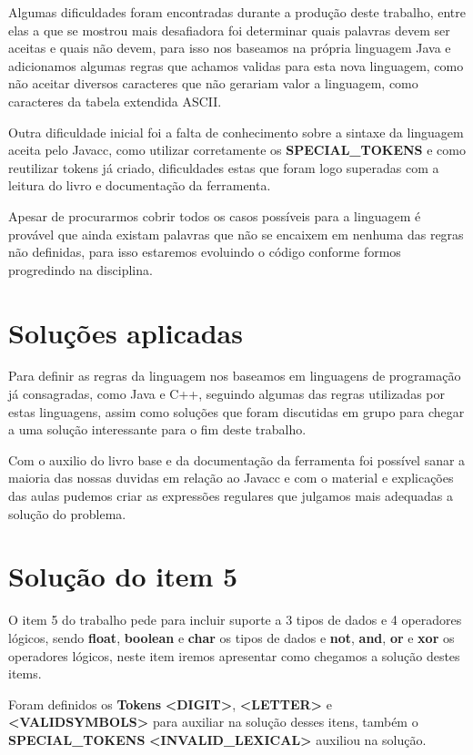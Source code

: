 \documentclass[
	article,			%
	11pt,				%
	oneside,			%
	a4paper,			%
	portuguese,			%
	brazil,				%
	sumario=tradicional
	]{abntex2}
\begin{document}
Algumas dificuldades foram encontradas durante a produção deste trabalho, entre elas a que se mostrou mais desafiadora foi determinar quais palavras devem ser aceitas e 
quais não devem, para isso nos baseamos na própria linguagem Java e adicionamos algumas regras que achamos validas para esta nova linguagem, como não aceitar diversos caracteres que não gerariam valor a linguagem, como caracteres da  tabela extendida ASCII.

Outra dificuldade inicial foi a falta de conhecimento sobre a sintaxe da linguagem aceita pelo Javacc, como utilizar corretamente os \textbf{SPECIAL\_TOKENS} e como reutilizar tokens
já criado, dificuldades estas que foram logo superadas com a leitura do livro e documentação da ferramenta.

Apesar de procurarmos cobrir todos os casos possíveis para a linguagem é provável que ainda existam palavras que não se encaixem em nenhuma das regras não definidas,
para isso estaremos evoluindo o código conforme formos progredindo na disciplina.

\section{Soluções aplicadas}

Para definir as regras da linguagem nos baseamos em linguagens de programação já consagradas, como Java e C++, seguindo algumas das regras utilizadas por estas
linguagens, assim como soluções que foram discutidas em grupo para chegar a uma solução interessante para o fim deste trabalho.

Com o auxilio do livro base e da documentação da ferramenta foi possível  sanar a maioria das nossas duvidas em relação ao Javacc e com o material e explicações das aulas
pudemos criar as expressões regulares que julgamos mais adequadas a solução do problema.

\section{Solução do item 5}

O item 5 do trabalho pede para incluir suporte a 3 tipos de dados e 4 operadores lógicos, sendo \textbf{float}, \textbf{boolean} e \textbf{char} os tipos de dados 
e \textbf{not}, \textbf{and}, \textbf{or} e \textbf{xor} os operadores lógicos, neste item iremos apresentar como chegamos a solução destes items.

Foram definidos os \textbf{Tokens} \textbf{<DIGIT>}, \textbf{<LETTER>} e \textbf{<VALIDSYMBOLS>} para auxiliar na solução desses itens, também o \textbf{SPECIAL\_TOKENS} 
\textbf{<INVALID\_LEXICAL>} auxiliou na solução.
\end{document}
